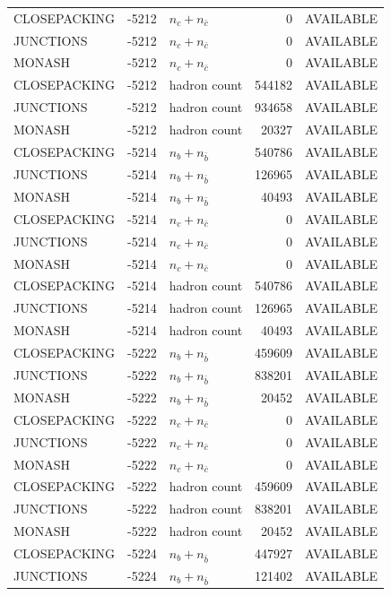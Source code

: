 \begin{landscape}
\begin{longtable}{@{}lrlrl@{}}
CLOSEPACKING & -5212 & $n_c+n_{\bar c}$ & \num{0} & AVAILABLE \\
JUNCTIONS & -5212 & $n_c+n_{\bar c}$ & \num{0} & AVAILABLE \\
MONASH & -5212 & $n_c+n_{\bar c}$ & \num{0} & AVAILABLE \\
CLOSEPACKING & -5212 & hadron count & \num{544182} & AVAILABLE \\
JUNCTIONS & -5212 & hadron count & \num{934658} & AVAILABLE \\
MONASH & -5212 & hadron count & \num{20327} & AVAILABLE \\
CLOSEPACKING & -5214 & $n_b+n_{\bar b}$ & \num{540786} & AVAILABLE \\
JUNCTIONS & -5214 & $n_b+n_{\bar b}$ & \num{126965} & AVAILABLE \\
MONASH & -5214 & $n_b+n_{\bar b}$ & \num{40493} & AVAILABLE \\
CLOSEPACKING & -5214 & $n_c+n_{\bar c}$ & \num{0} & AVAILABLE \\
JUNCTIONS & -5214 & $n_c+n_{\bar c}$ & \num{0} & AVAILABLE \\
MONASH & -5214 & $n_c+n_{\bar c}$ & \num{0} & AVAILABLE \\
CLOSEPACKING & -5214 & hadron count & \num{540786} & AVAILABLE \\
JUNCTIONS & -5214 & hadron count & \num{126965} & AVAILABLE \\
MONASH & -5214 & hadron count & \num{40493} & AVAILABLE \\
CLOSEPACKING & -5222 & $n_b+n_{\bar b}$ & \num{459609} & AVAILABLE \\
JUNCTIONS & -5222 & $n_b+n_{\bar b}$ & \num{838201} & AVAILABLE \\
MONASH & -5222 & $n_b+n_{\bar b}$ & \num{20452} & AVAILABLE \\
CLOSEPACKING & -5222 & $n_c+n_{\bar c}$ & \num{0} & AVAILABLE \\
JUNCTIONS & -5222 & $n_c+n_{\bar c}$ & \num{0} & AVAILABLE \\
MONASH & -5222 & $n_c+n_{\bar c}$ & \num{0} & AVAILABLE \\
CLOSEPACKING & -5222 & hadron count & \num{459609} & AVAILABLE \\
JUNCTIONS & -5222 & hadron count & \num{838201} & AVAILABLE \\
MONASH & -5222 & hadron count & \num{20452} & AVAILABLE \\
CLOSEPACKING & -5224 & $n_b+n_{\bar b}$ & \num{447927} & AVAILABLE \\
JUNCTIONS & -5224 & $n_b+n_{\bar b}$ & \num{121402} & AVAILABLE \\

\end{longtable}
\end{landscape}
